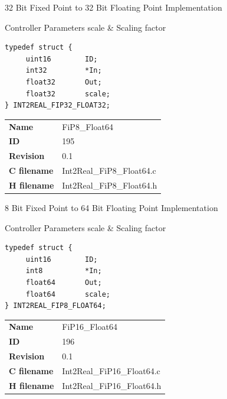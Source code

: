 32 Bit Fixed Point to 32 Bit Floating Point Implementation

\begin{XtoCtabular}{Controller Parameters}
scale & Scaling factor\tabularnewline
\hline
\end{XtoCtabular}

\begin{lstlisting}
typedef struct {
     uint16        ID;
     int32         *In;
     float32       Out;
     float32       scale;
} INT2REAL_FIP32_FLOAT32;
\end{lstlisting}

\ifdefined \AddTestReports
{}
\fi
{}
\nopagebreak[0]
\begin{tabular}{l l}
\textbf{Name} & FiP8\_Float64 \tabularnewline
\textbf{ID} & 195 \tabularnewline
\textbf{Revision} & 0.1 \tabularnewline
\textbf{C filename} & Int2Real\_FiP8\_Float64.c \tabularnewline
\textbf{H filename} & Int2Real\_FiP8\_Float64.h \tabularnewline
\end{tabular}
\vspace{1ex}

8 Bit Fixed Point to 64 Bit Floating Point Implementation

\begin{XtoCtabular}{Controller Parameters}
scale & Scaling factor\tabularnewline
\hline
\end{XtoCtabular}

\begin{lstlisting}
typedef struct {
     uint16        ID;
     int8          *In;
     float64       Out;
     float64       scale;
} INT2REAL_FIP8_FLOAT64;
\end{lstlisting}

\ifdefined \AddTestReports
{}
\fi
{}
\nopagebreak[0]
\begin{tabular}{l l}
\textbf{Name} & FiP16\_Float64 \tabularnewline
\textbf{ID} & 196 \tabularnewline
\textbf{Revision} & 0.1 \tabularnewline
\textbf{C filename} & Int2Real\_FiP16\_Float64.c \tabularnewline
\textbf{H filename} & Int2Real\_FiP16\_Float64.h \tabularnewline
\end{tabular}
\vspace{1ex}


